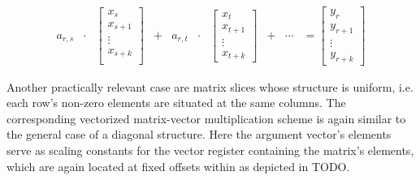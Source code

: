 \documentclass{article}
\begin{document}
      \begin{equation}
        \begin{matrix}
          a_{r,s} & \cdot & \begin{bmatrix}
                                    x_s      \\
                                    x_{s+1}  \\
                                      \vdots \\
                                    x_{s+k}  \\
          \end{bmatrix} & + & a_{r,t} & \cdot & \begin{bmatrix}
                                                x_t \\
                                                x_{t+1} \\
                                                \vdots \\
                                                x_{t+k}
                                                                              \end{bmatrix} & + & \cdots & =  \begin{bmatrix}
                                                                                                                 y_{r} \\
                                                                                                                 y_{r+1} \\
                                                                                                                 \vdots \\
                                                                                                                 y_{r+k}
                                                                                                                \end{bmatrix}
        \end{matrix}
      \end{equation}

      Another practically relevant case are matrix slices whose structure is uniform, i.e. each row's non-zero elements are situated at the same columns. The corresponding vectorized matrix-vector multiplication scheme is again similar to the general case of a diagonal structure. Here the argument vector's elements serve as scaling constants for the vector register containing the matrix's elements, which are again located at fixed offsets within \V  as depicted in TODO.
\end{document}
